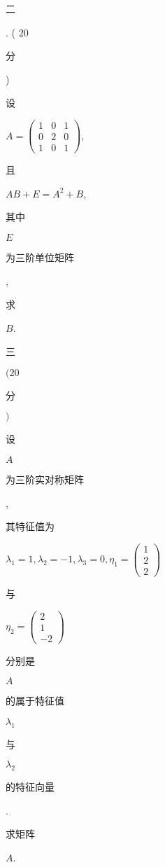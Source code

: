 \documentclass[10pt]{article}
\begin{document}
\begin{CJK}{UTF8}{mj}二\end{CJK}. ( 20 \begin{CJK}{UTF8}{mj}分\end{CJK}) \begin{CJK}{UTF8}{mj}设\end{CJK} $A=\left(\begin{array}{lll}1 & 0 & 1 \\ 0 & 2 & 0 \\ 1 & 0 & 1\end{array}\right)$, \begin{CJK}{UTF8}{mj}且\end{CJK} $A B+E=A^{2}+B$, \begin{CJK}{UTF8}{mj}其中\end{CJK} $E$ \begin{CJK}{UTF8}{mj}为三阶单位矩阵\end{CJK}, \begin{CJK}{UTF8}{mj}求\end{CJK} $B$.

\begin{CJK}{UTF8}{mj}三\end{CJK} $(20$ \begin{CJK}{UTF8}{mj}分\end{CJK} $)$ \begin{CJK}{UTF8}{mj}设\end{CJK} $A$ \begin{CJK}{UTF8}{mj}为三阶实对称矩阵\end{CJK}, \begin{CJK}{UTF8}{mj}其特征值为\end{CJK} $\lambda_{1}=1, \lambda_{2}=-1, \lambda_{3}=0, \eta_{1}=\left(\begin{array}{c}1 \\ 2 \\ 2\end{array}\right)$ \begin{CJK}{UTF8}{mj}与\end{CJK} $\eta_{2}=\left(\begin{array}{c}2 \\ 1 \\ -2\end{array}\right)$ \begin{CJK}{UTF8}{mj}分别是\end{CJK} $A$ \begin{CJK}{UTF8}{mj}的属于特征值\end{CJK} $\lambda_{1}$ \begin{CJK}{UTF8}{mj}与\end{CJK} $\lambda_{2}$ \begin{CJK}{UTF8}{mj}的特征向量\end{CJK}. \begin{CJK}{UTF8}{mj}求矩阵\end{CJK} $A$.
\end{document}
